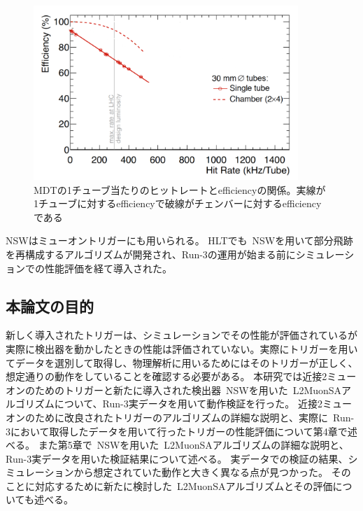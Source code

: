 \begin{figure}[H]
    \centering
    \includegraphics[clip, width=10cm]{fig/3/NSW_HitRate.png}
    \caption{MDTの1チューブ当たりのヒットレートとefficiencyの関係。実線が1チューブに対するefficiencyで破線がチェンバーに対するefficiencyである\cite{article:ATLASNSWTDR}}
    \label{fig:3-14}
\end{figure}


NSWはミューオントリガーにも用いられる。
HLTでも~NSWを用いて部分飛跡を再構成するアルゴリズムが開発され、Run-3の運用が始まる前にシミュレーションでの性能評価を経て導入された。

\subsection{本論文の目的}\label{chapter3-4}
新しく導入されたトリガーは、シミュレーションでその性能が評価されているが実際に検出器を動かしたときの性能は評価されていない。実際にトリガーを用いてデータを選別して取得し、物理解析に用いるためにはそのトリガーが正しく、想定通りの動作をしていることを確認する必要がある。
本研究では近接2ミューオンのためのトリガーと新たに導入された検出器~NSWを用いた~L2MuonSAアルゴリズムについて、Run-3実データを用いて動作検証を行った。
近接2ミューオンのために改良されたトリガーのアルゴリズムの詳細な説明と、実際に~Run-3において取得したデータを用いて行ったトリガーの性能評価について第4章で述べる。
また第5章で~NSWを用いた~L2MuonSAアルゴリズムの詳細な説明と、Run-3実データを用いた検証結果について述べる。
実データでの検証の結果、シミュレーションから想定されていた動作と大きく異なる点が見つかった。
そのことに対応するために新たに検討した~L2MuonSAアルゴリズムとその評価についても述べる。